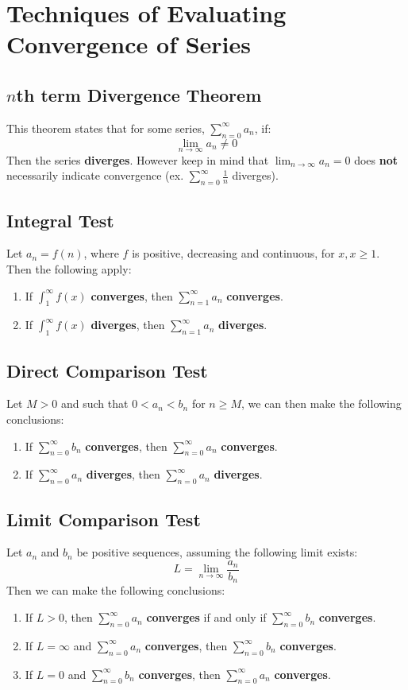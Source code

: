 \documentclass[a4paper]{article}
\begin{document}
  \section{Techniques of Evaluating Convergence of Series} 
  \subsection[Divergence Theorem]{$n$th term Divergence Theorem}
  This theorem states that for some series, $\sum_{n=0}^\infty a_n$, if:
   \[
    \lim_{n \rightarrow \infty} a_n \neq 0 
   \] 
   Then the series \textbf{diverges}. However keep in mind that $\lim_{n \rightarrow \infty} a_n = 0$ does \textbf{not} necessarily indicate convergence (ex. $\sum_{n=0}^\infty \displaystyle\frac{1 }{n}$ diverges).
  \subsection{Integral Test}
  Let $a_n = f(n)$, where $f$ is positive, decreasing and continuous, for $x, x\geq 1$. Then the following apply:
  \begin{enumerate}
    \item If $\int_1^\infty f(x)$ \textbf{converges}, then $\sum_{n=1}^\infty a_n$ \textbf{converges}.
    \item If $\int_1^\infty f(x)$ \textbf{diverges}, then $\sum_{n=1}^\infty a_n$ \textbf{diverges}.
  \end{enumerate}
  \subsection{Direct Comparison Test}
  Let $M > 0$ and such that $0 < a_n < b_n$ for $n \geq M$, we can then make the following conclusions:
  \begin{enumerate}
    \item If $\sum_{n=0}^\infty b_n$ \textbf{converges}, then $\sum_{n=0}^\infty a_n$ \textbf{converges}.
    \item If $\sum_{n=0}^\infty a_n$ \textbf{diverges}, then $\sum_{n=0}^\infty a_n$ \textbf{diverges}.
  \end{enumerate}
  \subsection{Limit Comparison Test}
  Let $a_n$ and $b_n$ be positive sequences, assuming the following limit exists:
  \[
    L = \lim_{n\rightarrow \infty} \displaystyle\frac{a_n }{b_n}
  \]
  Then we can make the following conclusions:
  \begin{enumerate}
    \item If $L > 0$, then $\sum_{n=0}^\infty a_n$ \textbf{converges} if and only if $\sum_{n=0}^\infty b_n$ \textbf{converges}.
    \item If $L = \infty$ and $\sum_{n=0}^\infty a_n$ \textbf{converges}, then $\sum_{n=0}^\infty b_n$ \textbf{converges}.
    \item If $L = 0$ and $\sum_{n=0}^\infty b_n$ \textbf{converges}, then $\sum_{n=0}^\infty a_n$ \textbf{converges}.
  \end{enumerate}
\end{document}
